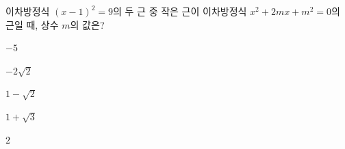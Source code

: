 이차방정식 $(x-1)^2=9$의 두 근 중 작은 근이 이차방정식 $x^2+2mx+m^2=0$의 근일 때, 상수 $m$의 값은?
\begin{choices32}{\rule[-3ex]{0pt}{8ex}$-5$}{\rule[-3ex]{0pt}{8ex}$-2\sqrt{2}$}{\rule[-3ex]{0pt}{8ex}$1-\sqrt{2}$}{\rule[-3ex]{0pt}{8ex}$1+\sqrt{3}$}{\rule[-3ex]{0pt}{8ex}$2$}\end{choices32}
